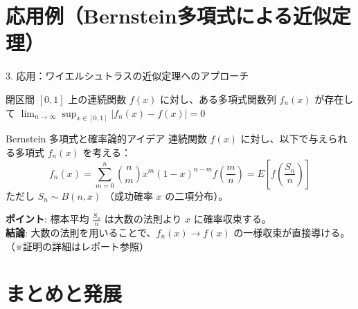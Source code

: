 \documentclass[10pt, aspectratio=169, dvipdfmx]{beamer}
\begin{document}
\section{応用例（Bernstein多項式による近似定理）}

\begin{frame}{3. 応用：ワイエルシュトラスの近似定理へのアプローチ}
    \begin{theorem}[ワイエルシュトラスの近似定理]
        閉区間 $[0, 1]$ 上の連続関数 $f(x)$ に対し、ある多項式関数列 $f_n(x)$ が存在して $\lim_{n \to \infty} \sup_{x \in [0, 1]} |f_n(x) - f(x)| = 0$
    \end{theorem}

    \pause
    \begin{exampleblock}{Bernstein 多項式と確率論的アイデア}
        連続関数 $f(x)$ に対し、以下で与えられる多項式 $f_n(x)$ を考える：
        \[
            f_n(x) = \sum_{m=0}^n \binom{n}{m} x^m (1-x)^{n-m} f\left(\frac{m}{n}\right) = E\left[ f\left(\frac{S_n}{n}\right) \right]
        \]
        ただし $S_n \sim B(n, x)$ （成功確率 $x$ の二項分布）。
    \end{exampleblock}

    \pause
    \textbf{ポイント}: 標本平均 $\frac{S_n}{n}$ は大数の法則より $x$ に確率収束する。\\
    \textbf{結論}: 大数の法則を用いることで、$f_n(x) \to f(x)$ の一様収束が直接導ける。（※証明の詳細はレポート参照）
\end{frame}




\section{まとめと発展}
\end{document}

